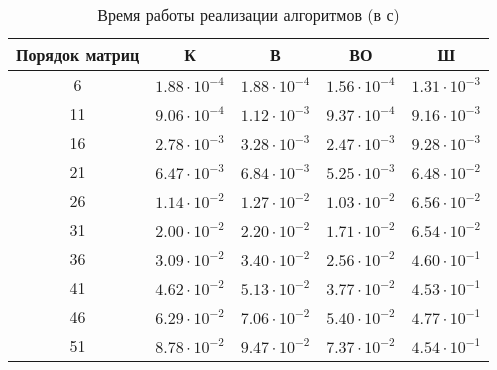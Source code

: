 \begin{table}[h]
	\begin{center}
		\begin{threeparttable}
			\captionsetup{justification=raggedright,singlelinecheck=off}
			\caption{Время работы реализации алгоритмов (в с)}
			\label{tbl:time_measurements}
			\begin{tabular}{|c|c|c|c|c|}
				\hline
				Порядок матриц & К & В & ВО & Ш \\
				\hline
				6 &$ 1.88\cdot 10^{-4} $&$ 1.88\cdot 10^{-4} $&$ 1.56\cdot 10^{-4} $&$ 1.31\cdot 10^{-3}$\\
				\hline
				11 &$ 9.06\cdot 10^{-4} $&$ 1.12\cdot 10^{-3} $&$ 9.37\cdot 10^{-4} $&$ 9.16\cdot 10^{-3}$\\
				\hline
				16 &$ 2.78\cdot 10^{-3} $&$ 3.28\cdot 10^{-3} $&$ 2.47\cdot 10^{-3} $&$ 9.28\cdot 10^{-3}$\\
				\hline
				21 &$ 6.47\cdot 10^{-3} $&$ 6.84\cdot 10^{-3} $&$ 5.25\cdot 10^{-3} $&$ 6.48\cdot 10^{-2}$\\
				\hline
				26 &$ 1.14\cdot 10^{-2} $&$ 1.27\cdot 10^{-2} $&$ 1.03\cdot 10^{-2} $&$ 6.56\cdot 10^{-2}$\\
				\hline
				31 &$ 2.00\cdot 10^{-2} $&$ 2.20\cdot 10^{-2} $&$ 1.71\cdot 10^{-2} $&$ 6.54\cdot 10^{-2}$\\
				\hline
				36 &$ 3.09\cdot 10^{-2} $&$ 3.40\cdot 10^{-2} $&$ 2.56\cdot 10^{-2} $&$ 4.60\cdot 10^{-1}$\\
				\hline
				41 &$ 4.62\cdot 10^{-2} $&$ 5.13\cdot 10^{-2} $&$ 3.77\cdot 10^{-2} $&$ 4.53\cdot 10^{-1}$\\
				\hline
				46 &$ 6.29\cdot 10^{-2} $&$ 7.06\cdot 10^{-2} $&$ 5.40\cdot 10^{-2} $&$ 4.77\cdot 10^{-1}$\\
				\hline
				51 &$ 8.78\cdot 10^{-2} $&$ 9.47\cdot 10^{-2} $&$ 7.37\cdot 10^{-2} $&$ 4.54\cdot 10^{-1}$\\
			\hline
			\end{tabular}
		\end{threeparttable}
	\end{center}
\end{table}

